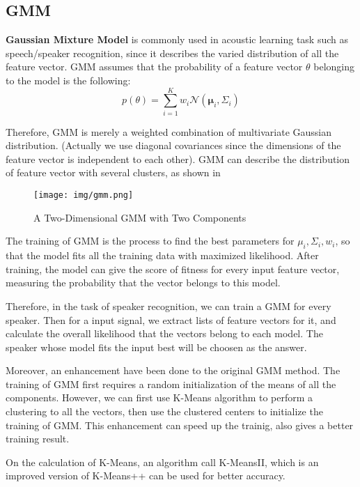 
\subsection{GMM}
\textbf{Gaussian Mixture Model} is commonly used in acoustic learning task such as speech/speaker recognition,
since it describes the varied distribution of all the feature vector.\cite{GMM}
GMM assumes that the probability of a feature vector $ \theta$ belonging to the model is the following:
    \[ p(\theta) = \sum_{i=1}^{K}{w_i \mathcal{N}(\mathbf{\mu}_i, \Sigma_i)}\]

  Therefore, GMM is merely a weighted combination of multivariate Gaussian distribution.
  (Actually we use diagonal covariances since the dimensions of the feature vector is independent to each other).
  GMM can describe the distribution of feature vector with several clusters, as shown in 
\begin{figure}[H]
  \centering
  \texttt{[image: img/gmm.png]}
  \caption{A Two-Dimensional GMM with Two Components\label{fig:gmm-fig}}
\end{figure}

The training of GMM is the process to find the best parameters for $ \mu_i, \Sigma_i, w_i$,
so that the model fits all the training data with maximized likelihood.
After training, the model can give the score of fitness for every input feature vector,
measuring the probability that the vector belongs to this model.

Therefore, in the task of speaker recognition, we can train a GMM for every speaker.
Then for a input signal, we extract lists of feature vectors for it, and calculate the
overall likelihood that the vectors belong to each model.
The speaker whose model fits the input best will be choosen as the answer.

Moreover, an enhancement have been done to the original GMM method.
The training of GMM first requires a random initialization of the means of
all the components. However, we can first use K-Means algorithm\cite{kmeans} to perform a clustering
to all the vectors, then use the clustered centers to initialize the training of GMM.
This enhancement can speed up the trainig, also gives a better training result.

On the calculation of K-Means, an algorithm call K-MeansII\cite{bahmani2012scalable},
which is an improved version of K-Means++\cite{arthur2007k} can be used for better accuracy.

